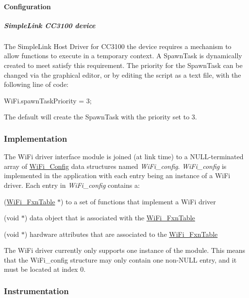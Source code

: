 \paragraph*{Configuration}

\subparagraph*{Simple\+Link C\+C3100 device}

The Simple\+Link Host Driver for C\+C3100 the device requires a mechanism to allow functions to execute in a temporary context. A Spawn\+Task is dynamically created to meet satisfy this requirement. The priority for the Spawn\+Task can be changed via the graphical editor, or by editing the script as a text file, with the following line of code\+: 
\begin{DoxyCode}
WiFi.spawnTaskPriority = 3;
\end{DoxyCode}
 The default will create the Spawn\+Task with the priority set to 3.

\subsubsection*{Implementation}

The Wi\+Fi driver interface module is joined (at link time) to a N\+U\+L\+L-\/terminated array of \hyperlink{struct_wi_fi___config}{Wi\+Fi\+\_\+\+Config} data structures named {\itshape Wi\+Fi\+\_\+config}. {\itshape Wi\+Fi\+\_\+config} is implemented in the application with each entry being an instance of a Wi\+Fi driver. Each entry in {\itshape Wi\+Fi\+\_\+config} contains a\+:
\begin{DoxyItemize}
\item (\hyperlink{struct_wi_fi___fxn_table}{Wi\+Fi\+\_\+\+Fxn\+Table} $\ast$) to a set of functions that implement a Wi\+Fi driver
\item (void $\ast$) data object that is associated with the \hyperlink{struct_wi_fi___fxn_table}{Wi\+Fi\+\_\+\+Fxn\+Table}
\item (void $\ast$) hardware attributes that are associated to the \hyperlink{struct_wi_fi___fxn_table}{Wi\+Fi\+\_\+\+Fxn\+Table}
\end{DoxyItemize}

The Wi\+Fi driver currently only supports one instance of the module. This means that the Wi\+Fi\+\_\+config structure may only contain one non-\/\+N\+U\+L\+L entry, and it must be located at index 0.

\subsubsection*{Instrumentation}

